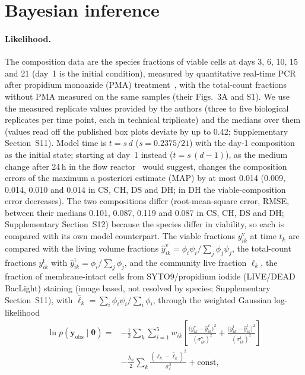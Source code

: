 \documentclass[preprint,12pt]{elsarticle}
\newcommand{\btheta}{\boldsymbol{\theta}}
\newcommand{\yobs}{\mathbf{y}_{\mathrm{obs}}}
\begin{document}
\section{Bayesian inference}
\label{sec:inference}

\paragraph{Likelihood.}
The composition data are the species fractions of viable cells at days 3, 6, 10, 15 and 21 (day~1 is the initial condition), measured by quantitative real-time PCR after propidium monoazide (PMA) treatment~\citep{heine2025influence}, with the total-count fractions without PMA measured on the same samples (their Figs.~3A and S1).
We use the measured replicate values provided by the authors (three to five biological replicates per time point, each in technical triplicate) and the medians over them (values read off the published box plots deviate by up to 0.42; Supplementary Section~S11).
Model time is $t=s\,d$ ($s=0.2375/21$) with the day-1 composition as the initial state; starting at day~1 instead ($t=s\,(d-1)$), as the medium change after 24\,h in the flow reactor~\citep{heine2025influence} would suggest, changes the composition errors of the maximum a posteriori estimate (MAP) by at most 0.014 (0.009, 0.014, 0.010 and 0.014 in CS, CH, DS and DH; in DH the viable-composition error decreases).
The two compositions differ (root-mean-square error, RMSE, between their medians 0.101, 0.087, 0.119 and 0.087 in CS, CH, DS and DH; Supplementary Section~S12) because the species differ in viability, so each is compared with its own model counterpart.
The viable fractions $y^{\mathrm{v}}_{ik}$ at time $t_k$ are compared with the living volume fractions $\hat y^{\mathrm{v}}_{ik}=\phi_i\psi_i/\sum_j\phi_j\psi_j$, the total-count fractions $y^{\mathrm{t}}_{ik}$ with $\hat y^{\mathrm{t}}_{ik}=\phi_i/\sum_j\phi_j$, and the community live fraction $\ell_k$, the fraction of membrane-intact cells from SYTO9/propidium iodide (LIVE/DEAD BacLight) staining (image based, not resolved by species; Supplementary Section~S11), with $\hat\ell_k=\sum_i\phi_i\psi_i/\sum_i\phi_i$, through the weighted Gaussian log-likelihood
\begin{equation}
\begin{split}
\ln p(\yobs\mid\btheta)={}&-\frac12\sum_{k}\sum_{i=1}^{5}w_{ik}\left[\frac{\bigl(y^{\mathrm{v}}_{ik}-\hat y^{\mathrm{v}}_{ik}\bigr)^2}{(\sigma^{\mathrm{v}}_{ik})^2}+\frac{\bigl(y^{\mathrm{t}}_{ik}-\hat y^{\mathrm{t}}_{ik}\bigr)^2}{(\sigma^{\mathrm{t}}_{ik})^2}\right]\\
&-\frac{\lambda_\psi}{2}\sum_k\frac{(\ell_k-\hat\ell_k)^2}{\sigma_\ell^2}+\mathrm{const},
\end{split}
\label{eq:lik}
\end{equation}
\end{document}
